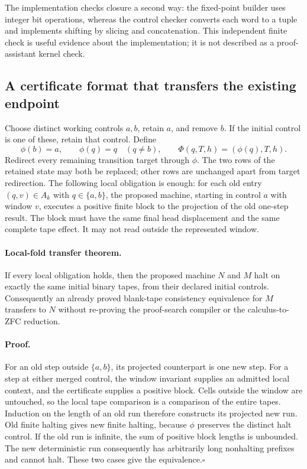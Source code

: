 The implementation checks closure a second way: the fixed-point builder
uses integer bit operations, whereas the control checker converts each word
to a tuple and implements shifting by slicing and concatenation.  This
independent finite check is useful evidence about the implementation; it is
not described as a proof-assistant kernel check.

\subsection{A certificate format that transfers the existing endpoint}

Choose distinct working controls $a,b$, retain $a$, and remove $b$.  If the
initial control is one of these, retain that control.  Define
\[
 \phi(b)=a,\qquad \phi(q)=q\quad(q\ne b),\qquad
 \Phi(q,T,h)=(\phi(q),T,h).
\]
Redirect every remaining transition target through $\phi$.  The two rows
of the retained state may both be replaced; other rows are unchanged apart
from target redirection.  The following local obligation is enough:
for each old entry $(q,v)\in A_k$ with $q\in\{a,b\}$, the proposed machine,
starting in control $a$ with window $v$, executes a positive finite block to
the projection of the old one-step result.  The block must have the same
final head displacement and the same complete tape effect.  It may not
read outside the represented window.

\paragraph{Local-fold transfer theorem.}
If every local obligation holds, then the proposed machine $N$ and $M$
halt on exactly the same initial binary tapes, from their declared initial
controls.  Consequently an already proved blank-tape consistency equivalence
for $M$ transfers to $N$ without re-proving the proof-search compiler or the
calculus-to-ZFC reduction.

\paragraph{Proof.}
For an old step outside $\{a,b\}$, its projected counterpart is one new
step.  For a step at either merged control, the window invariant supplies
an admitted local context, and the certificate supplies a positive block.
Cells outside the window are untouched, so the local tape comparison is a
comparison of the entire tapes.  Induction on the length of an old run
therefore constructs its projected new run.  Old finite halting gives new
finite halting, because $\phi$ preserves the distinct halt control.  If the
old run is infinite, the sum of positive block lengths is unbounded.  The
new deterministic run consequently has arbitrarily long nonhalting prefixes
and cannot halt.  These two cases give the equivalence.\hfill$\square$

